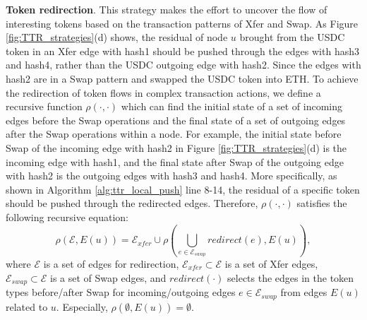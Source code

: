 \textbf{Token redirection}.
This strategy makes the effort to uncover the flow of interesting tokens based on the transaction patterns of Xfer and Swap.
As Figure \ref{fig:TTR_strategies}(d) shows, the residual of node $u$ brought from the USDC token in an Xfer edge with hash1 should be pushed through the edges with hash3 and hash4, rather than the USDC outgoing edge with hash2. Since the edges with hash2 are in a Swap pattern and swapped the USDC token into ETH.
To achieve the redirection of token flows in complex transaction actions, we define a recursive function $\rho(\cdot,\cdot)$ which can find the initial state of a set of incoming edges before the Swap operations and the final state of a set of outgoing edges after the Swap operations within a node. For example, the initial state before Swap of the incoming edge with hash2 in Figure \ref{fig:TTR_strategies}(d) is the incoming edge with hash1, and the final state after Swap of the outgoing edge with hash2 is the outgoing edges with hash3 and hash4. More specifically, as shown in Algorithm \ref{alg:ttr_local_push} line 8-14, the residual of a specific token should be pushed through the redirected edges. Therefore, $\rho(\cdot,\cdot)$ satisfies the following recursive equation:
\begin{equation}\label{equation:token_redirect}
    \rho(\mathcal{E}, E(u))=\mathcal{E}_{xfer} \cup \rho(\bigcup\limits_{e \in \mathcal{E}_{swap}} redirect(e), E(u)),    
\end{equation}
where $\mathcal{E}$ is a set of edges for redirection, $\mathcal{E}_{xfer} \subset \mathcal{E}$ is a set of Xfer edges, $\mathcal{E}_{swap} \subset \mathcal{E}$ is a set of Swap edges, and $redirect(\cdot)$ selects the edges in the token types before/after Swap for incoming/outgoing edges $e \in \mathcal{E}_{swap}$ from edges $E(u)$ related to $u$.
Especially, $\rho(\emptyset, E(u)) = \emptyset$.

